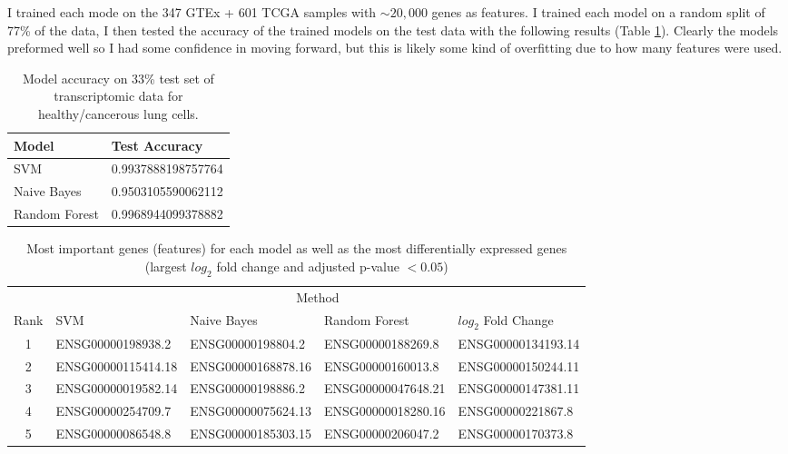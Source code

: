 I trained each mode on the 347 GTEx + 601 TCGA samples with $\sim 20,000$ genes as features.
I trained each model on a random split of 77\% of the data, I then tested the accuracy of the trained models on the test data with the following results (Table \ref{ta}).
Clearly the models preformed well so I had some confidence in moving forward, but this is likely some kind of overfitting due to how many features were used.
\begin{table}[h]
    \centering
    \begin{tabular}{@{}ll@{}}
        \toprule
        Model & Test Accuracy \\
        \midrule
        SVM & 0.9937888198757764\\
        Naive Bayes & 0.9503105590062112\\
        Random Forest & 0.9968944099378882\\
        \bottomrule
    \end{tabular}
    \caption{Model accuracy on 33\% test set of transcriptomic data for healthy/cancerous lung cells.}
    \label{ta}
\end{table}
\FloatBarrier
\begin{table}[h]
    \centering
    \begin{tabular}{@{}cllll@{}}
        \toprule
        & \multicolumn{4}{c}{Method} \\
        \cmidrule(l){2-5}
        Rank & SVM & Naive Bayes & Random Forest & $log_2$ Fold Change \\
        \midrule
        1 & ENSG00000198938.2  & ENSG00000198804.2  & ENSG00000188269.8  & ENSG00000134193.14\\
        2 & ENSG00000115414.18 & ENSG00000168878.16 & ENSG00000160013.8  & ENSG00000150244.11\\
        3 & ENSG00000019582.14 & ENSG00000198886.2  & ENSG00000047648.21 & ENSG00000147381.11\\
        4 & ENSG00000254709.7  & ENSG00000075624.13 & ENSG00000018280.16 & ENSG00000221867.8\\
        5 & ENSG00000086548.8  & ENSG00000185303.15 & ENSG00000206047.2  & ENSG00000170373.8\\
        \bottomrule
    \end{tabular}
    \caption{Most important genes (features) for each model as well as the most differentially expressed genes (largest $log_2$ fold change and adjusted p-value $< 0.05$)}
    \label{tb}
\end{table}
\FloatBarrier

